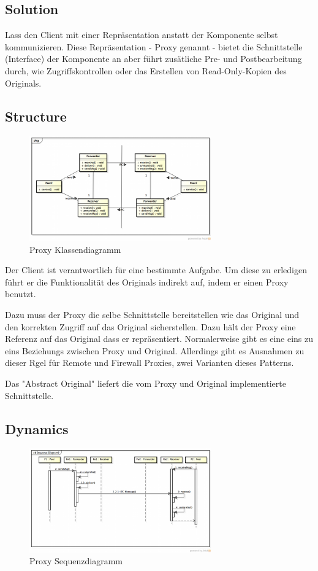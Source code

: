 \subsection*{Solution}


Lass den Client mit einer Repräsentation anstatt der Komponente selbst kommunizieren. Diese Repräsentation - Proxy genannt - bietet die Schnittstelle (Interface) der Komponente an aber führt zusätliche Pre- und Postbearbeitung durch, wie Zugriffskontrollen oder das Erstellen von Read-Only-Kopien des Originals.

\subsection*{Structure}
\begin{figure}[H]
	\centering
	\includegraphics[width=0.7\textwidth]{content/posa1/images/proxy-classes.png}
	\caption{Proxy Klassendiagramm}
\end{figure}

Der Client ist verantwortlich für eine bestimmte Aufgabe. Um diese zu erledigen führt er die Funktionalität des Originals indirekt auf, indem er einen Proxy benutzt.

Dazu muss der Proxy die selbe Schnittstelle bereitstellen wie das Original und den korrekten Zugriff auf das Original sicherstellen. Dazu hält der Proxy eine Referenz auf das Original dass er repräsentiert. Normalerweise gibt es eine eins zu eins Beziehungs zwischen Proxy und Original. Allerdings gibt es Ausnahmen zu dieser Rgel für Remote und Firewall Proxies, zwei Varianten dieses Patterns.

Das "Abstract Original" liefert die vom Proxy und Original implementierte Schnittstelle.

\subsection*{Dynamics}

\begin{figure}[H]
	\centering
	\includegraphics[width=0.7\textwidth]{content/posa1/images/proxy-sequence.png}
	\caption{Proxy Sequenzdiagramm}
\end{figure}

